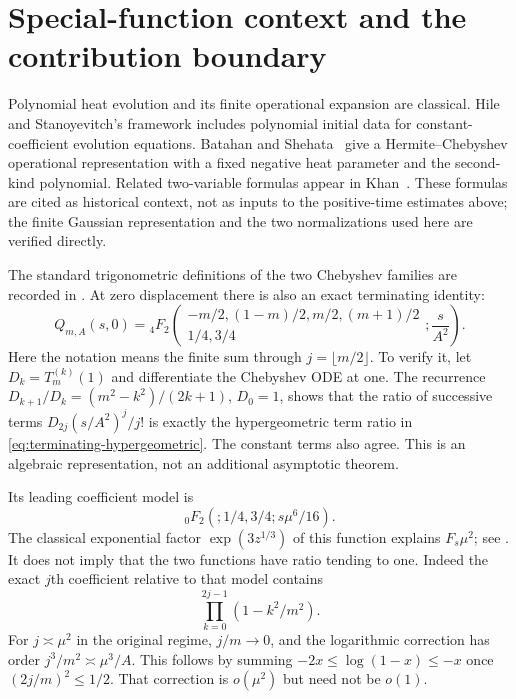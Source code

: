 \section{Special-function context and the contribution boundary}
\label{sec:literature}

Polynomial heat evolution and its finite operational expansion are
classical. Hile and Stanoyevitch's framework
\cite[Theorem 1 and (2.18)]{HileStanoyevitch2001} includes polynomial
initial data for constant-coefficient evolution equations.
Batahan and Shehata~\cite[Theorem 3.1]{BatahanShehata2014} give a
Hermite--Chebyshev operational representation with a fixed negative
heat parameter and the second-kind polynomial. Related two-variable
formulas appear in Khan~\cite{Khan2019}. These formulas are cited as
historical context, not as inputs to the positive-time estimates above;
the finite Gaussian representation and the two normalizations used here
are verified directly.

The standard trigonometric definitions of the two Chebyshev families
are recorded in \cite[\S18.5]{DLMF}. At zero displacement there is also
an exact terminating identity:
\begin{equation}\label{eq:terminating-hypergeometric}
 Q_{m,A}(s,0)={}_4F_2\left(\begin{matrix}
 -m/2,(1-m)/2,m/2,(m+1)/2\\1/4,3/4
 \end{matrix};\frac{s}{A^2}\right).
\end{equation}
Here the notation means the finite sum through $j=\lfloor m/2\rfloor$.
To verify it, let $D_k=T_m^{(k)}(1)$ and differentiate the Chebyshev
ODE at one. The recurrence
$D_{k+1}/D_k=(m^2-k^2)/(2k+1)$, $D_0=1$, shows that the ratio of
successive terms $D_{2j}(s/A^2)^j/j!$ is exactly the hypergeometric
term ratio in \eqref{eq:terminating-hypergeometric}.
The constant terms also agree. This is an algebraic representation,
not an additional asymptotic theorem.

Its leading coefficient model is
\[
 {}_0F_2(;1/4,3/4;s\mu^6/16).
\]
The classical exponential factor $\exp(3z^{1/3})$ of this function
explains $F_s\mu^2$; see \cite[\S16.11]{DLMF}.
It does not imply that the two functions have ratio tending to one.
Indeed the exact $j$th coefficient relative to that model contains
\[
 \prod_{k=0}^{2j-1}(1-k^2/m^2).
\]
For $j\asymp\mu^2$ in the original regime, $j/m\to0$, and the
logarithmic correction has order $j^3/m^2\asymp\mu^3/A$.
This follows by summing
$-2x\le\log(1-x)\le-x$ once $(2j/m)^2\le1/2$.
That correction is $o(\mu^2)$ but need not be $o(1)$.

